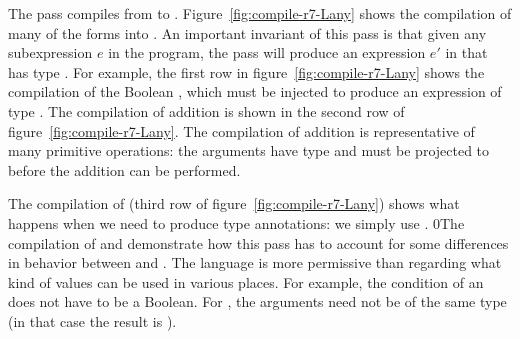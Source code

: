\documentclass[7x10]{TimesAPriori_MIT}%
\def\racketEd{0}
\providecommand{\BookEdition}{1}
\let\edition\BookEdition
\newcommand{\racket}[1]{{\if\edition\racketEd{#1}\fi}}
\numberwithin{theorem}{chapter}
\numberwithin{definition}{chapter}
\numberwithin{equation}{chapter}
\begin{document}
The  pass compiles from \LangDyn{} to \LangAny{}.
Figure~\ref{fig:compile-r7-Lany} shows the compilation of many of the
\LangDyn{} forms into \LangAny{}. An important invariant of this pass
is that given any subexpression $e$ in the \LangDyn{} program, the
pass will produce an expression $e'$ in \LangAny{} that has type
\ANYTY{}. For example, the first row in
figure~\ref{fig:compile-r7-Lany} shows the compilation of the Boolean
\TRUE{}, which must be injected to produce an expression of type
\ANYTY{}.
%
The compilation of addition is shown in the second row of
figure~\ref{fig:compile-r7-Lany}. The compilation of addition is
representative of many primitive operations: the arguments have type
\ANYTY{} and must be projected to \INTTYPE{} before the addition can
be performed.

The compilation of  (third row of
figure~\ref{fig:compile-r7-Lany}) shows what happens when we need to
produce type annotations: we simply use \ANYTY{}.
%
\racket{The compilation of  and   demonstrate how
  this pass has to account for some differences in behavior between
  \LangDyn{} and \LangAny{}. The \LangDyn{} language is more
  permissive than \LangAny{} regarding what kind of values can be used
  in various places. For example, the condition of an \key{if} does
  not have to be a Boolean. For \key{eq?}, the arguments need not be
  of the same type (in that case the result is \code{\#f}).}
\end{document}
